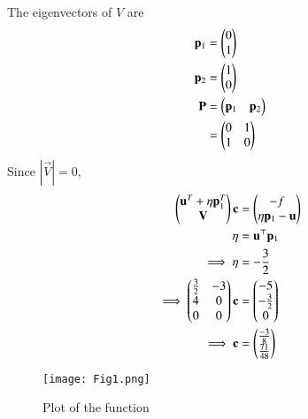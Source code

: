 \documentclass[journal,12pt,twocolumn]{IEEEtran}
\begin{document}
The eigenvectors of $V$ are
\begin{align}
    \mathbf{p}_1 &= \begin{pmatrix}0 \\ 1\end{pmatrix}\\
    \mathbf{p}_2 &= \begin{pmatrix}1 \\ 0\end{pmatrix}\\
    \mathbf{P} &= \begin{pmatrix}\mathbf{p}_1 & \mathbf{p}_2\end{pmatrix}\\
    &= \begin{pmatrix}0 & 1 \\ 1 & 0\end{pmatrix}
\end{align}
Since $|\vec{V}| = 0$,
\begin{align}
    \begin{pmatrix}\mathbf{u}^T+\eta \mathbf{p}_1^T \\ \mathbf{V}\end{pmatrix}\mathbf{c} &= \begin{pmatrix}-f \\ \eta \mathbf{p}_1-\mathbf{u}\end{pmatrix}\\
    \eta &= \mathbf{u}^\top \mathbf{p}_1\\
    \implies \eta &= -\frac{3}{2}\\
    \implies \begin{pmatrix}\frac{3}{2} & -3 \\ 4 & 0 \\ 0 & 0\end{pmatrix}\mathbf{c} &= \begin{pmatrix}-5 \\ -\frac{3}{2} \\ 0\end{pmatrix}\\
    \implies \mathbf{c} &= \begin{pmatrix}\frac{-3}{8}\\\frac{71}{48}\end{pmatrix}
\end{align}
\begin{figure}[htp]
    \centering
    \texttt{[image: Fig1.png]}
    \caption{Plot of the function}
    \label{fig:plot}
\end{figure}
\end{document}
